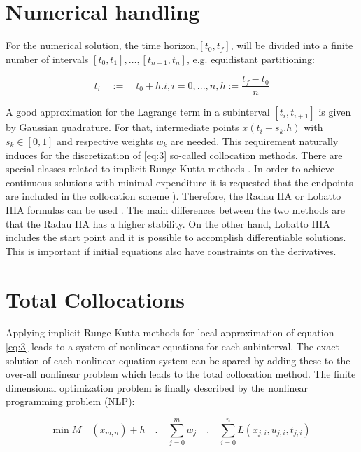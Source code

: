\section{Numerical handling}
\label{sec:numericalhandling}

For the numerical solution, the time horizon,$ [t_0,t_f] $, will be divided into a finite number of intervals $[t_0,t_1 ],…,[t_{n-1},t_n ]$, e.g. equidistant partitioning:

\begin{equation*}
	t_i\quad:=\quad t_0+h.i,i=0,...,n,h:= \frac{t_f-t_0}{n} 
\end{equation*}

A good approximation for the Lagrange term in a subinterval $[t_i,t_{i+1}]$ is given by Gaussian quadrature. For that, intermediate points $x(t_i+s_k.h)$ with $s_k\in [0,1]$ and respective weights $ w_k $ are needed. This requirement naturally induces for the discretization of \ref{eq:3} so-called collocation methods. There are special classes related to implicit Runge-Kutta methods \cite{deuflhard}. In order to achieve continuous solutions with minimal expenditure it is requested that the endpoints are included in the collocation scheme \cite{bernhard}). Therefore, the Radau IIA or Lobatto IIIA formulas can be used \cite{hermann}. The main differences between the two methods are that the Radau IIA has a higher stability. On the other hand, Lobatto IIIA includes the start point and it is possible to accomplish differentiable solutions. This is important if initial equations also have constraints on the derivatives.

\section{Total Collocations}
\label{sec:totalcollocations}

Applying implicit Runge-Kutta methods for local approximation of equation \ref{eq:3} leads to a system of nonlinear equations for each subinterval. The exact solution of each nonlinear equation system can be spared by adding these to the over-all nonlinear problem \cite{biegler} which leads to the total collocation method. The finite dimensional optimization problem is finally described by the nonlinear programming problem (NLP):

\begin{equation}\label{eq:6}
   \text{min} \; M\quad(x_{m,n}) + h\quad.\quad \sum_{j=0}^{m} w_j\quad .\quad\sum_{i=0}^{n} L(x_{j,i},u_{j,i}, t_{j,i} )
\end{equation}

